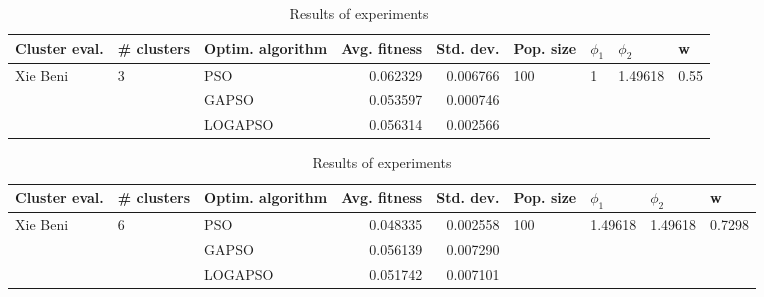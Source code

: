 \documentclass{article}
\begin{document}
\begin{table}
\centering
\caption{Results of experiments}
\begin{tabular}{lllrrllll}
\toprule
            Cluster eval. &        \# clusters & Optim. algorithm &  Avg. fitness &  Std. dev. &            Pop. size &         $\phi_{1}$ &               $\phi_{2}$ &                     w \\
\midrule
\multirow{3}{*}{Xie Beni} & \multirow{3}{*}{3} &              PSO &      0.062329 &   0.006766 & \multirow{3}{*}{100} & \multirow{3}{*}{1} & \multirow{3}{*}{1.49618} & \multirow{3}{*}{0.55} \\
                          &                    &            GAPSO &      0.053597 &   0.000746 &                      &                    &                          &                       \\
                          &                    &          LOGAPSO &      0.056314 &   0.002566 &                      &                    &                          &                       \\
\bottomrule
\end{tabular}
\end{table}
\begin{table}
\centering
\caption{Results of experiments}
\begin{tabular}{lllrrllll}
\toprule
            Cluster eval. &        \# clusters & Optim. algorithm &  Avg. fitness &  Std. dev. &            Pop. size &               $\phi_{1}$ &               $\phi_{2}$ &                       w \\
\midrule
\multirow{3}{*}{Xie Beni} & \multirow{3}{*}{6} &              PSO &      0.048335 &   0.002558 & \multirow{3}{*}{100} & \multirow{3}{*}{1.49618} & \multirow{3}{*}{1.49618} & \multirow{3}{*}{0.7298} \\
                          &                    &            GAPSO &      0.056139 &   0.007290 &                      &                          &                          &                         \\
                          &                    &          LOGAPSO &      0.051742 &   0.007101 &                      &                          &                          &                         \\
\bottomrule
\end{tabular}
\end{table}
\end{document}
